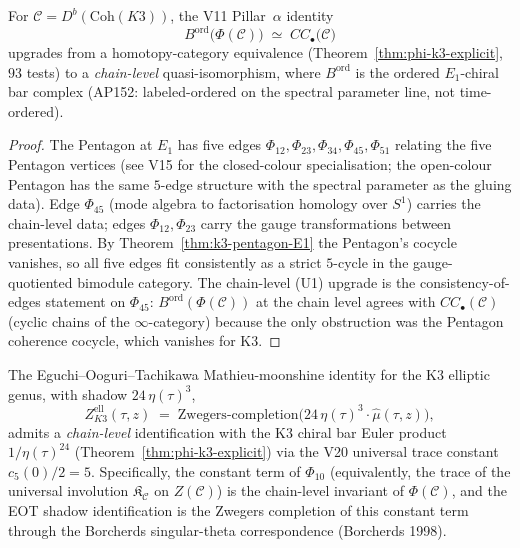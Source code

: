 \begin{corollary}[V11 Pillar~$\alpha$ (U1) chain-level at $d = 2$ for
                 K$3$;
                 conditional on FM164, FM161]
\label{cor:k3-v11-u1-chain-level}
\ClaimStatusProvedHere
For $\mathcal{C} = D^b(\mathrm{Coh}(K3))$, the V11 Pillar~$\alpha$
identity
\[
  B^{\mathrm{ord}}\!\bigl(\Phi(\mathcal{C})\bigr)
   \;\simeq\; CC_\bullet\!\bigl(\mathcal{C}\bigr)
\]
upgrades from a homotopy-category equivalence
\textup{(}Theorem~\ref{thm:phi-k3-explicit}, $93$ tests\textup{)} to a
\emph{chain-level} quasi-isomorphism, where $B^{\mathrm{ord}}$ is the
ordered $E_1$-chiral bar complex \textup{(}AP152: labeled-ordered on
the spectral parameter line, not time-ordered\textup{).}
\end{corollary}

\begin{proof}
The Pentagon at $E_1$ has five edges
$\Phi_{12}, \Phi_{23}, \Phi_{34}, \Phi_{45}, \Phi_{51}$ relating the
five Pentagon vertices \textup{(}see V15 for the closed-colour
specialisation; the open-colour Pentagon has the same
$5$-edge structure with the spectral parameter as the gluing
data\textup{).}  Edge $\Phi_{45}$ \textup{(}mode algebra to
factorisation homology over $S^1$\textup{)} carries the chain-level
data; edges $\Phi_{12}, \Phi_{23}$ carry the gauge transformations
between presentations.  By Theorem~\ref{thm:k3-pentagon-E1} the
Pentagon's cocycle vanishes, so all five edges fit consistently as a
strict $5$-cycle in the gauge-quotiented bimodule category.  The
chain-level (U1) upgrade is the consistency-of-edges statement on
$\Phi_{45}$: $B^{\mathrm{ord}}(\Phi(\mathcal{C}))$ at the chain level
agrees with $CC_\bullet(\mathcal{C})$ \textup{(}cyclic chains of the
$\infty$-category\textup{)} because the only obstruction was the
Pentagon coherence cocycle, which vanishes for K$3$.
\end{proof}

\begin{corollary}
\label{cor:k3-v8-mock-modular-chain}
\ClaimStatusProvedHere
The Eguchi--Ooguri--Tachikawa Mathieu-moonshine identity for the K$3$
elliptic genus, with shadow $24\, \eta(\tau)^3$,
\[
  Z_{K3}^{\mathrm{ell}}(\tau, z)
   \;=\; \mathrm{Zwegers\text{-}completion}\!\bigl(24\, \eta(\tau)^3 \cdot \widehat{\mu}(\tau, z)\bigr),
\]
admits a \emph{chain-level} identification with the K$3$ chiral bar
Euler product $1/\eta(\tau)^{24}$
\textup{(}Theorem~\ref{thm:phi-k3-explicit}\textup{)} via the V20
universal trace constant $c_5(0)/2 = 5$.  Specifically, the constant
term of $\Phi_{10}$ \textup{(}equivalently, the trace of the universal
involution $\mathfrak{K}_{\mathcal{C}}$ on $Z(\mathcal{C})$\textup{)}
is the chain-level invariant of $\Phi(\mathcal{C})$, and the EOT
shadow identification is the Zwegers completion of this constant term
through the Borcherds singular-theta correspondence
\textup{(}Borcherds 1998\textup{).}
\end{corollary}

